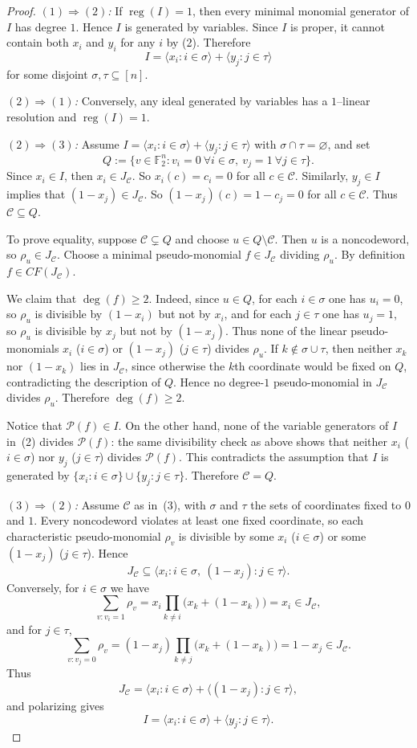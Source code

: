 \documentclass[10pt,a4paper]{amsart}
\DeclareMathOperator{\reg}{reg}
\def\P{{\mathcal P}}
\newcommand{\C}{\mathcal{C}}
\newcommand{\F}{\mathbb{F}}
\begin{document}
\begin{proof}
\emph{$(1)\Rightarrow(2)$:}
If $\reg(I)=1$, then every minimal monomial generator of $I$ has degree $1$. Hence $I$ is generated by variables.
Since $I$ is proper, it cannot contain both $x_i$ and $y_i$ for any $i$ by (2).
Therefore
\[
I=\langle x_i:i\in\sigma\rangle+\langle y_j:j\in\tau\rangle
\]
for some disjoint $\sigma,\tau\subseteq[n]$.


\emph{$(2)\Rightarrow(1)$:}
Conversely, any ideal generated by variables has a $1$--linear resolution and $\reg(I)=1$.


\emph{$(2)\Rightarrow(3)$:}
Assume $I=\langle x_i:i\in\sigma\rangle+\langle y_j:j\in\tau\rangle$ with $\sigma\cap\tau=\varnothing$, and set
\[
Q:=\{ v\in\F_2^n : v_i=0\ \forall i\in\sigma,\ v_j=1\ \forall j\in\tau \}.
\]
Since $x_i\in I$, then $x_i\in J_\C$. So $x_i(c)=c_i=0$ for all $c\in\C$.
Similarly, $y_j\in I$ implies that $(1-x_j)\in J_\C$. So $(1-x_j)(c)=1-c_j=0$ for all $c\in\C$.
Thus $\C\subseteq Q$.

To prove equality, suppose $\C\subsetneq Q$ and choose $u\in Q\setminus \C$.
Then $u$ is a noncodeword, so $\rho_u\in J_\C$.
Choose a minimal pseudo-monomial $f\in J_\C$ dividing $\rho_u$. By definition
$f\in CF(J_\C)$.

We claim that $\deg(f)\ge 2$.
Indeed, since $u\in Q$, for each $i\in\sigma$ one has $u_i=0$, so $\rho_u$ is divisible by $(1-x_i)$ but
not by $x_i$, and for each $j\in\tau$ one has $u_j=1$, so $\rho_u$ is divisible by $x_j$ but not by $(1-x_j)$.
Thus none of the linear pseudo-monomials $x_i$ ($i\in\sigma$) or $(1-x_j)$ ($j\in\tau$) divides $\rho_u$.
If $k\notin\sigma\cup\tau$, then neither $x_k$ nor $(1-x_k)$ lies in $J_\C$, since otherwise the $k$th
coordinate would be fixed on $Q$, contradicting the description of $Q$.
Hence no degree-$1$ pseudo-monomial in $J_\C$ divides $\rho_u$. Therefore $\deg(f)\ge 2$.

Notice that $\P(f)\in I$.
On the other hand, none of the variable generators of $I$ in~(2) divides $\P(f)$: the same divisibility
check as above shows that neither $x_i$ ($i\in\sigma$) nor $y_j$ ($j\in\tau$) divides $\P(f)$.
This contradicts the assumption that $I$ is generated by $\{x_i:i\in\sigma\}\cup\{y_j:j\in\tau\}$.
Therefore $\C=Q$.


\emph{$(3)\Rightarrow(2)$:}
Assume $\C$ as in~(3), with $\sigma$ and $\tau$ the sets of coordinates fixed to $0$ and $1$.
Every noncodeword violates at least one fixed coordinate, so each characteristic pseudo-monomial $\rho_v$ is divisible by
some $x_i$ ($i\in\sigma$) or some $(1-x_j)$ ($j\in\tau$). Hence
\[
J_\C\subseteq \langle x_i:i\in\sigma,\ (1-x_j):j\in\tau\rangle.
\]
Conversely, for $i\in\sigma$ we have
\[
\sum_{v:  v_i=1}\rho_v
 = 
x_i\prod_{k\neq i}\bigl(x_k+(1-x_k)\bigr)
 = x_i\in J_\C,
\]
and for $j\in\tau$,
\[
\sum_{v:  v_j=0}\rho_v
 = 
(1-x_j)\prod_{k\neq j}\bigl(x_k+(1-x_k)\bigr)
 = 1-x_j\in J_\C.
\]
Thus
\[
J_\C=\langle x_i:i\in\sigma \rangle +\langle (1-x_j):j\in\tau\rangle,
\]
and polarizing gives
\[
I=\langle x_i:i\in\sigma\rangle+\langle y_j:j\in\tau\rangle.
\]



\end{proof}
\end{document}
